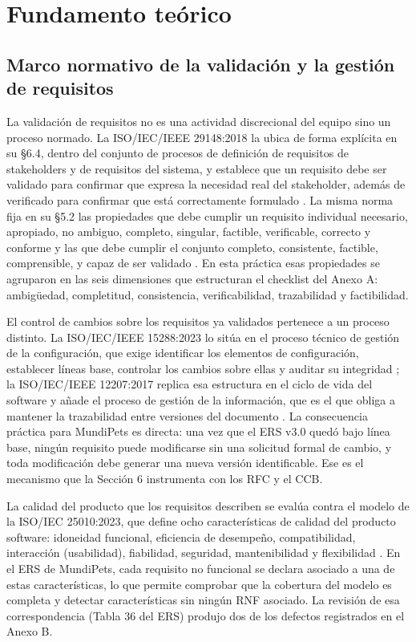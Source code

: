 \documentclass[journal,onecolumn]{IEEEtran}
\begin{document}
	\newpage
	
	\section{Fundamento teórico}
	
	\subsection{Marco normativo de la validación y la gestión de requisitos}
	
	La validación de requisitos no es una actividad discrecional del equipo sino un proceso normado. La ISO/IEC/IEEE 29148:2018 la ubica de forma explícita en su §6.4, dentro del conjunto de procesos de definición de requisitos de stakeholders y de requisitos del sistema, y establece que un requisito debe ser validado para confirmar que expresa la necesidad real del stakeholder, además de verificado para confirmar que está correctamente formulado \cite{ieee29148}. La misma norma fija en su §5.2 las propiedades que debe cumplir un requisito individual necesario, apropiado, no ambiguo, completo, singular, factible, verificable, correcto y conforme y las que debe cumplir el conjunto completo, consistente, factible, comprensible, y capaz de ser validado \cite{ieee29148}. En esta práctica esas propiedades se agruparon en las seis dimensiones que estructuran el checklist del Anexo A: ambigüedad, completitud, consistencia, verificabilidad, trazabilidad y factibilidad.
	
	El control de cambios sobre los requisitos ya validados pertenece a un proceso distinto. La ISO/IEC/IEEE 15288:2023 lo sitúa en el proceso técnico de gestión de la configuración, que exige identificar los elementos de configuración, establecer líneas base, controlar los cambios sobre ellas y auditar su integridad \cite{ieee15288}; la ISO/IEC/IEEE 12207:2017 replica esa estructura en el ciclo de vida del software y añade el proceso de gestión de la información, que es el que obliga a mantener la trazabilidad entre versiones del documento \cite{ieee12207}. La consecuencia práctica para MundiPets es directa: una vez que el ERS v3.0 quedó bajo línea base, ningún requisito puede modificarse sin una solicitud formal de cambio, y toda modificación debe generar una nueva versión identificable. Ese es el mecanismo que la Sección 6 instrumenta con los RFC y el CCB.
	
	La calidad del producto que los requisitos describen se evalúa contra el modelo de la ISO/IEC 25010:2023, que define ocho características de calidad del producto software: idoneidad funcional, eficiencia de desempeño, compatibilidad, interacción (usabilidad), fiabilidad, seguridad, mantenibilidad y flexibilidad \cite{iso25010}. En el ERS de MundiPets, cada requisito no funcional se declara asociado a una de estas características, lo que permite comprobar que la cobertura del modelo es completa y detectar características sin ningún RNF asociado. La revisión de esa correspondencia (Tabla 36 del ERS) produjo dos de los defectos registrados en el Anexo B.
	
\end{document}
